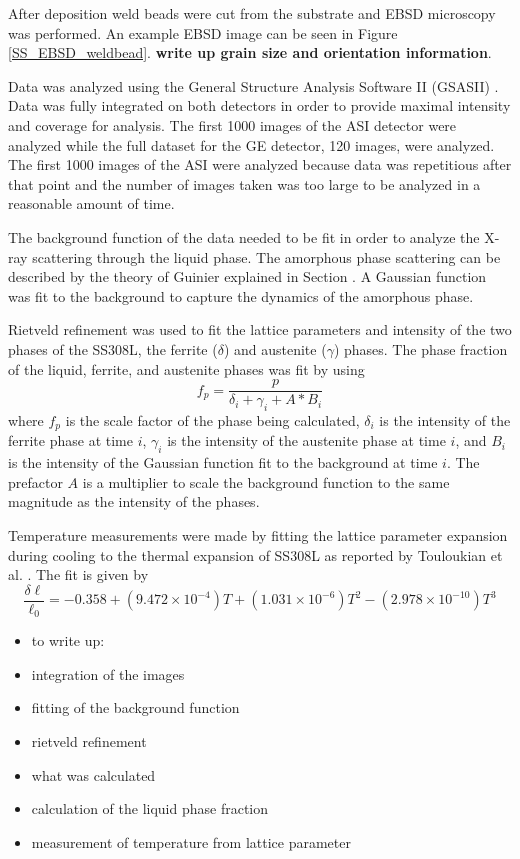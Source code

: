 After deposition weld beads were cut from the substrate and EBSD microscopy was performed. An example EBSD image can be seen in Figure \ref{SS_EBSD_weldbead}. \textbf{write up grain size and orientation information}.

Data was analyzed using the General Structure Analysis Software II (GSASII) \cite{GSASII}. Data was fully integrated on both detectors in order to provide maximal intensity and coverage for analysis. The first 1000 images of the ASI detector were analyzed while the full dataset for the GE detector, 120 images, were analyzed. The first 1000 images of the ASI were analyzed because data was repetitious after that point and the number of images taken was too large to be analyzed in a reasonable amount of time. 

The background function of the data needed to be fit in order to analyze the X-ray scattering through the liquid phase. The amorphous phase scattering can be described by the theory of Guinier explained in Section \cite{Guinier1994}. A Gaussian function was fit to the background to capture the dynamics of the amorphous phase. 

Rietveld refinement was used to fit the lattice parameters and intensity of the two phases of the SS308L, the ferrite ($\delta$) and austenite ($\gamma$) phases. The phase fraction of the liquid, ferrite, and austenite phases was fit by using
\begin{equation}
	f_{p} = \frac{p}{\delta_i + \gamma_i + A*B_i}
	\label{ferritefrac}
\end{equation}
where $f_{p}$ is the scale factor of the phase being calculated, $\delta_i$ is the intensity of the ferrite phase at time $i$, $\gamma_i$ is the intensity of the austenite phase at time $i$, and $B_i$ is the intensity of the Gaussian function fit to the background at time $i$. The prefactor $A$ is a multiplier to scale the background function to the same magnitude as the intensity of the phases. 

Temperature measurements were made by fitting the lattice parameter expansion during cooling to the thermal expansion of SS308L as reported by Touloukian et al. \cite{Touloukian1975}. The fit is given by
\begin{equation}
	\frac{\delta \ell}{\ell_0} = -0.358 + (9.472\times10^{-4})T + (1.031\times10^{-6})T^2 - (2.978\times10^{-10})T^3
	\label{touloukian}
\end{equation}

\begin{itemize}
	\item to write up:
	\item integration of the images
	\item fitting of the background function
	\item rietveld refinement
	\item what was calculated
	\item calculation of the liquid phase fraction
	\item measurement of temperature from lattice parameter
\end{itemize}

